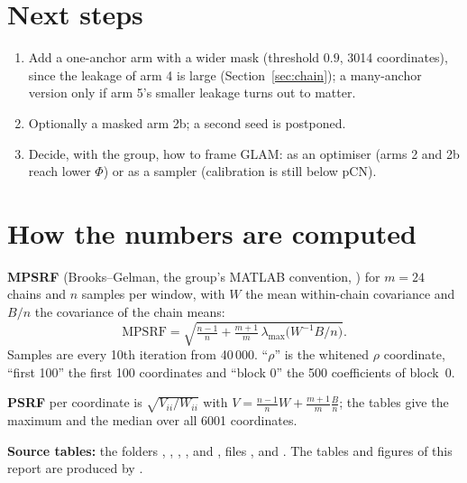 \documentclass[11pt]{article}
\begin{document}
\section{Next steps}
\begin{enumerate}
\item Add a one-anchor arm with a wider mask (threshold $0.9$, 3014 coordinates), since the leakage of arm 4 is large (Section~\ref{sec:chain}); a many-anchor version only if arm 5's smaller leakage turns out to matter.
\item Optionally a masked arm 2b; a second seed is postponed.
\item Decide, with the group, how to frame GLAM: as an optimiser (arms 2 and 2b reach lower $\Phi$) or as a sampler (calibration is still below pCN).
\end{enumerate}

\appendix
\section{How the numbers are computed}\label{sec:calc}
\textbf{MPSRF} (Brooks--Gelman, the group's MATLAB convention, ) for $m=24$ chains and $n$ samples per window, with $W$ the mean within-chain covariance and $B/n$ the covariance of the chain means:
\[
\mathrm{MPSRF}=\sqrt{\tfrac{n-1}{n}+\tfrac{m+1}{m}\,\lambda_{\max}\!\big(W^{-1}B/n\big)} .
\]
Samples are every 10th iteration from 40\,000. ``$\rho$'' is the whitened $\rho$ coordinate, ``first 100'' the first 100 coordinates and ``block 0'' the 500 coefficients of block~0.

\textbf{PSRF} per coordinate is $\sqrt{V_{ii}/W_{ii}}$ with $V=\tfrac{n-1}{n}W+\tfrac{m+1}{m}\tfrac Bn$; the tables give the maximum and the median over all 6001 coordinates.

\textbf{Source tables:} the folders , , , ,  and , files ,  and . The tables and figures of this report are produced by .
\end{document}
